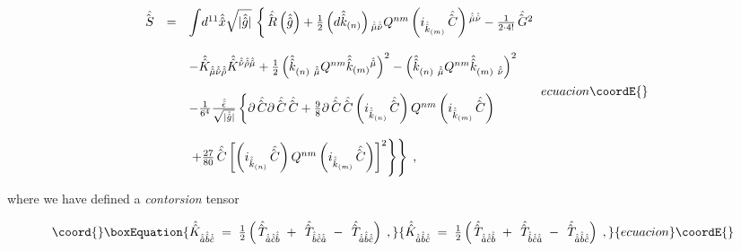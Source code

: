 \documentclass[12pt,a4paper]{article}
\begin{document}
\begin{equation}
{}{
\begin{array}{rcl}
\hat{\hat{S}\,}
& = &
{\displaystyle\int} d^{11}\hat{\hat{x}}\sqrt{|\hat{\hat{g}}|}\,
\left\{
\hat{\hat{R}\,}\left(\hat{\hat{g}}\right)
+\textstyle{\frac{1}{2}}\left(d\hat{\hat{k}}_{(n)}\right)
   {}_{\hat{\hat{\mu}}\hat{\hat{\nu}}}Q^{nm}
   \left( i_{\hat{\hat{k}}_{(m)}}\hat{\hat{C}\,}\right)
   {}^{\hat{\hat{\mu}}\hat{\hat{\nu}}}
-\textstyle{\frac{1}{2\cdot 4!}} \hat{\hat{G}\,}{}^{2}
\right.\\
& & \\
& &
-\hat{\hat{K}}_{\hat{\hat{\mu}}\hat{\hat{\nu}}\hat{\hat{\rho}}}
\hat{\hat{K}}{}^{\hat{\hat{\nu}}\hat{\hat{\rho}}\hat{\hat{\mu}}}
+\textstyle{\frac{1}{2}}
\left( \hat{\hat{k}}_{(n)\ \hat{\hat{\mu}}}Q^{nm}
\hat{\hat{k}}_{(m)}{}^{\hat{\hat{\mu}}}\right)^{2}
-\left(  \hat{\hat{k}}_{(n)\ \hat{\hat{\mu}}}Q^{nm}
\hat{\hat{k}}_{(m)\ \hat{\hat{\nu}}}\right)^{2}
\\
& & \\
& &
-\frac{1}{6^{4}}
\frac{\hat{\hat{\epsilon}}}{\sqrt{|\hat{\hat{g}}|}}
\left\{
\partial\hat{\hat{C}\,}\partial\hat{\hat{C}\,}\hat{\hat{C}\,}
+ \frac{9}{8}\partial\hat{\hat{C}\,}\hat{\hat{C}\,}
\left(i_{\hat{\hat{k}}_{(n)}}\hat{\hat{C}\,}\right)
Q^{nm}
\left(i_{\hat{\hat{k}}_{(m)}}\hat{\hat{C}\,}\right)
\right. \\
& & \\
& &
\left.
\left.
+ \frac{27}{80}
\hat{\hat{C}\,}
\left[
\left(i_{\hat{\hat{k}}_{(n)}}\hat{\hat{C}\,}\right)
 Q^{nm}
\left(i_{\hat{\hat{k}}_{(m)}}\hat{\hat{C}\,}\right)
\right]^{2}
\right\}
\right\}\; ,
\end{array}
}{ecuacion}\coordE{}\end{equation}

\noindent where we have defined a {\em contorsion} tensor

\begin{equation}\coord{}\boxEquation{
\hat{\hat{K}}_{\hat{\hat{a}}\hat{\hat{b}}\hat{\hat{c}}}
\;=\; {\textstyle\frac{1}{2}}
\left(
\hat{\hat{T}\,}_{\hat{\hat{a}}\hat{\hat{c}}\hat{\hat{b}}}
\; +\; \hat{\hat{T}\,}_{\hat{\hat{b}}\hat{\hat{c}}\hat{\hat{a}}}
\; -\; \hat{\hat{T}\,}_{\hat{\hat{a}}\hat{\hat{b}}\hat{\hat{c}}}
\right) \; ,
\label{eq:torsion.2}
}{
\hat{\hat{K}}_{\hat{\hat{a}}\hat{\hat{b}}\hat{\hat{c}}}
\;=\; {\textstyle\frac{1}{2}}
\left(
\hat{\hat{T}\,}_{\hat{\hat{a}}\hat{\hat{c}}\hat{\hat{b}}}
\; +\; \hat{\hat{T}\,}_{\hat{\hat{b}}\hat{\hat{c}}\hat{\hat{a}}}
\; -\; \hat{\hat{T}\,}_{\hat{\hat{a}}\hat{\hat{b}}\hat{\hat{c}}}
\right) \; ,
}{ecuacion}\coordE{}\end{equation}
\end{document}
